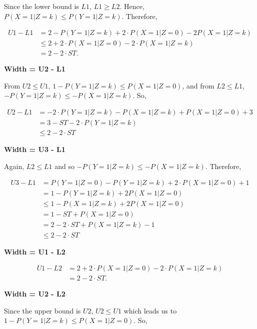 \documentclass[
]{article}
\theoremstyle{plain}
\begin{document}
Since the lower bound is \(L1\), \(L1 \ge L2\). Hence, \(P(X = 1 | Z = k) \le P(Y = 1 | Z = k)\). Therefore,

\[\begin{aligned}
U1 - L1 &= 2 - P(Y = 1 | Z = k) + 2\cdot P(X = 1 | Z = 0) - 2P(X = 1 | Z = k) \\
        &\le 2 + 2\cdot P(X = 1 | Z = 0) - 2\cdot P(X = 1 | Z = k) \\
        &= 2 - 2\cdot ST.
\end{aligned}\]

\textbf{Width = U2 - L1}

From \(U2 \le U1\), \(1 - P(Y = 1 | Z = k) \le P(X = 1 | Z = 0)\), and from \(L2 \le L1\), \(-P(Y = 1 | Z = k) \le -P(X = 1 | Z = k)\). So,

\[\begin{aligned}
U2 - L1 &= -2\cdot P(Y = 1 | Z = k) - P(X = 1 | Z = k) + P(X = 1 | Z = 0) + 3 \\
        &= 3 - ST - 2\cdot P(Y = 1 | Z = k) \\
        &\le 2 - 2\cdot ST
\end{aligned}\]

\textbf{Width = U3 - L1}

Again, \(L2 \le L1\) and so \(-P(Y = 1 | Z = k) \le -P(X = 1 | Z = k)\). Therefore,

\[\begin{aligned}
U3 - L1 &= P(Y = 1 | Z = 0) - P(Y = 1 | Z = k) + 2\cdot P(X = 1 | Z = 0) + 1 \\
        &= 1 - P(Y = 1 | Z = k) + 2 P(X = 1 | Z = 0) \\
        &\le 1 - P(X = 1 | Z = k) + 2 P(X = 1 | Z = 0) \\
        &= 1 - ST + P(X = 1 | Z = 0) \\
        &= 2 - 2\cdot ST + P(X = 1 | Z = k) - 1 \\
        &\le 2 - 2 \cdot ST
\end{aligned}\]

\textbf{Width = U1 - L2}

\[\begin{aligned}
U1 - L2 &= 2 + 2\cdot P(X = 1 | Z = 0) - 2\cdot P(X = 1 | Z = k) \\
        &= 2 - 2\cdot ST.
\end{aligned}\]

\textbf{Width = U2 - L2}

Since the upper bound is \(U2\), \(U2 \le U1\) which leads us to \(1 - P(Y = 1 | Z = k) \le P(X = 1 | Z = 0)\). So,
\end{document}
